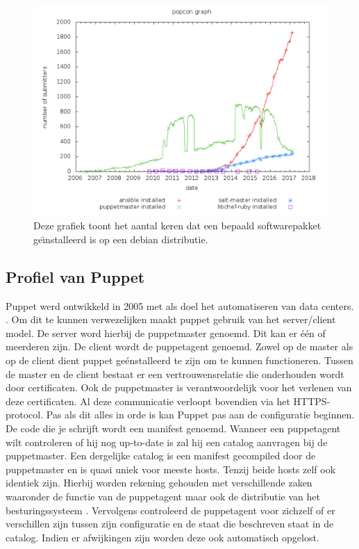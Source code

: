 \begin{figure}
  \includegraphics[width=\linewidth]{img/popcon_everybody.png}
  \caption{Deze grafiek toont het aantal keren dat een bepaald softwarepakket ge\"{\i}nstalleerd is op een debian distributie. \autocite{popcon}}
  \label{fig:popcon_everybody}
\end{figure}

\subsection{Profiel van Puppet}

Puppet werd ontwikkeld in 2005 met als doel het automatiseren van data centers. \autocite{puppetfaq}. Om dit te kunnen verwezelijken maakt puppet gebruik van  het server/client model. De server word hierbij de puppetmaster genoemd. Dit kan er   \'e\'en of meerderen zijn. De client wordt de puppetagent genoemd. Zowel op de master als op de client dient puppet ge\'enstalleerd te zijn om te kunnen functioneren. Tussen de master en de client bestaat er een vertrouwensrelatie die onderhouden wordt door certificaten. Ook de puppetmaster is verantwoordelijk voor het verlenen van deze certificaten. Al deze communicatie verloopt bovendien via het HTTPS-protocol. Pas als dit alles in orde is kan Puppet pas aan de configuratie beginnen. De code die je schrijft wordt een manifest genoemd. Wanneer een puppetagent wilt controleren of hij nog up-to-date is zal hij een catalog aanvragen bij de puppetmaster. Een dergelijke catalog is een manifest gecompiled door de puppetmaster en is quasi uniek voor meeste hosts. Tenzij beide hosts zelf ook identiek zijn. Hierbij worden rekening gehouden met verschillende zaken waaronder de functie van de puppetagent maar ook de distributie van het besturingssysteem \autocite{puppetlanguagecatalog}. Vervolgens controleerd de puppetagent voor zichzelf of er verschillen zijn tussen zijn configuratie en de staat die beschreven staat in de catalog. Indien er afwijkingen zijn worden deze ook automatisch opgelost.\autocite{puppetdoc}


